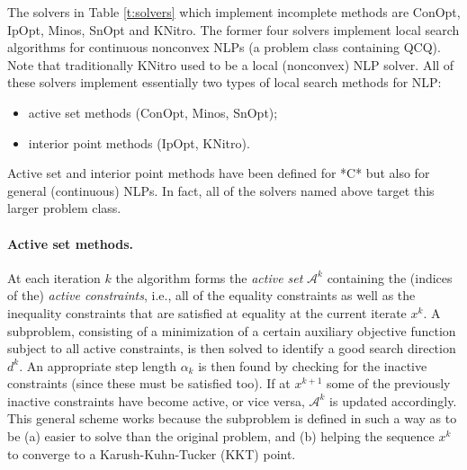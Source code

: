 The solvers in Table \ref{t:solvers} which implement incomplete methods are {\sc ConOpt}, {\sc IpOpt}, {\sc Minos}, {\sc SnOpt} and {\sc KNitro}. The former four solvers implement local search algorithms for continuous nonconvex NLPs (a problem class containing QCQ). Note that traditionally {\sc KNitro} used to be a local (nonconvex) NLP solver. All of these solvers implement essentially two types of local search methods for NLP:
%
\begin{itemize}
 \item active set methods ({\sc ConOpt}, {\sc Minos}, {\sc SnOpt});
 \item interior point methods ({\sc IpOpt}, {\sc KNitro}).
\end{itemize}
%
Active set and interior point methods have been defined for *C* but also for general (continuous) NLPs. In fact, all of the solvers named above target this larger problem class.

\paragraph{Active set methods.}
%
At each iteration $k$ the algorithm forms the {\it active set} $\mathcal{A}^k$ containing the (indices of the) {\it active constraints}, i.e., all of the equality constraints as well as the inequality constraints that are satisfied at equality at the current iterate $x^k$. A subproblem, consisting of a minimization of a certain auxiliary objective function subject to all active constraints, is then solved to identify a good search direction $d^k$. An appropriate step length $\alpha_k$ is then found by checking for the inactive constraints (since these must be satisfied too). If at $x^{k+1}$ some of the previously inactive constraints have become active, or vice versa, $\mathcal{A}^k$ is updated accordingly. This general scheme works because the subproblem is defined in such a way as to be (a) easier to solve than the original problem, and (b) helping the sequence $x^k$ to converge to a Karush-Kuhn-Tucker (KKT) point. 

